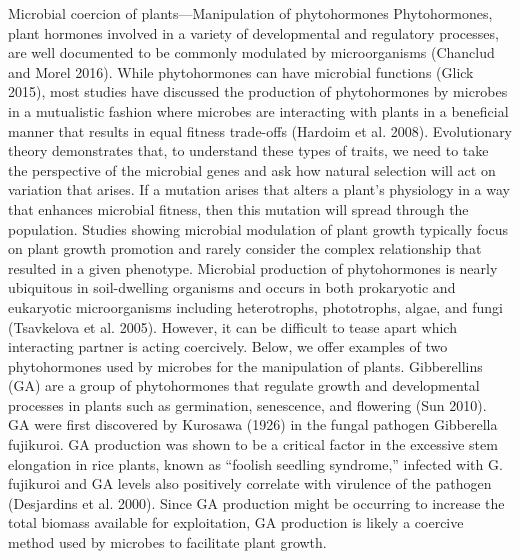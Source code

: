 \documentclass[PhD]{msu-thesis}
\begin{document}
Microbial coercion of plants—Manipulation of phytohormones 
Phytohormones, plant hormones involved in a variety of developmental and regulatory processes, are well documented to be commonly modulated by microorganisms (Chanclud and Morel 2016). While phytohormones can have microbial functions (Glick 2015), most studies have discussed the production of phytohormones by microbes in a mutualistic fashion where microbes are interacting with plants in a beneficial manner that results in equal fitness trade-offs (Hardoim et al. 2008). Evolutionary theory demonstrates that, to understand these types of traits, we need to take the perspective of the microbial genes and ask how natural selection will act on variation that arises. If a mutation arises that alters a plant’s physiology in a way that enhances microbial fitness, then this mutation will spread through the population. Studies showing microbial modulation of plant growth typically focus on plant growth promotion and rarely consider the complex relationship that resulted in a given phenotype. Microbial production of phytohormones is nearly ubiquitous in soil-dwelling organisms and occurs in both prokaryotic and eukaryotic microorganisms including heterotrophs, phototrophs, algae, and fungi (Tsavkelova et al. 2005). However, it can be difficult to tease apart which interacting partner is acting coercively. Below, we offer examples of two phytohormones used by microbes for the manipulation of plants.  
Gibberellins (GA) are a group of phytohormones that regulate growth and developmental processes in plants such as germination, senescence, and flowering (Sun 2010). GA were first discovered by Kurosawa (1926) in the fungal pathogen Gibberella fujikuroi. GA production was shown to be a critical factor in the excessive stem elongation in rice plants, known as “foolish seedling syndrome,” infected with G. fujikuroi and GA levels also positively correlate with virulence of the pathogen (Desjardins et al. 2000). Since GA production might be occurring to increase the total biomass available for exploitation, GA production is likely a coercive method used by microbes to facilitate plant growth. 
\end{document}

